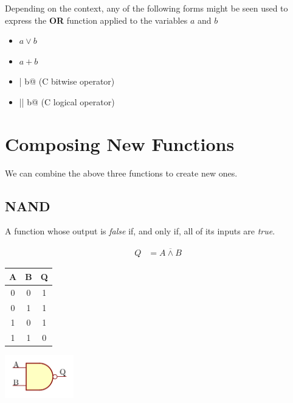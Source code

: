 \documentclass[10pt]{article}
\begin{document}
Depending on the context, any of the following forms might be seen used to 
express the {\bfseries OR} function applied to the variables $a$ and $b$

\begin{itemize}
\item $a\lor b$
\item $a+b$
\item \verb@a | b@ (C bitwise operator)
\item \verb@a || b@ (C logical operator)
\end{itemize}

\section{Composing New Functions}

We can combine the above three functions to create new ones.

\subsection{NAND}

A function whose output is {\em false} if, and only if, all of its inputs are {\em true}.

\begin{align}
Q &= \overline{A \land B}
\end{align}

\begin{center}
\begin{tabular}{|cc|c|}
\hline
A & B & Q \\
\hline
0 & 0 & 1 \\
0 & 1 & 1 \\
1 & 0 & 1 \\
1 & 1 & 0 \\
\hline
\end{tabular}

\includegraphics[width=3cm]{nand.png}
\end{center}
\end{document}
